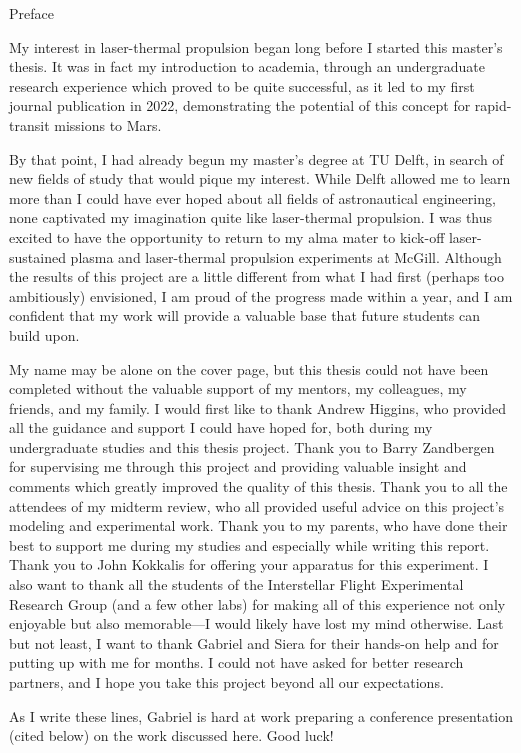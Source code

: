 \begin{plainchp}{Preface}
    \begin{refsection}
    My interest in laser-thermal propulsion began long before I started this master's thesis. It was in fact my introduction to academia, through an undergraduate research experience which proved to be quite successful, as it led to my first journal publication in 2022, demonstrating the potential of this concept for rapid-transit missions to Mars.
    
    By that point, I had already begun my master's degree at TU Delft, in search of new fields of study that would pique my interest. While Delft allowed me to learn more than I could have ever hoped about all fields of astronautical engineering, none captivated my imagination quite like laser-thermal propulsion. I was thus excited to have the opportunity to return to my alma mater to kick-off laser-sustained plasma and laser-thermal propulsion experiments at McGill. Although the results of this project are a little different from what I had first (perhaps too ambitiously) envisioned, I am proud of the progress made within a year, and I am confident that my work will provide a valuable base that future students can build upon.

    My name may be alone on the cover page, but this thesis could not have been completed without the valuable support of my mentors, my colleagues, my friends, and my family. I would first like to thank Andrew Higgins, who provided all the guidance and support I could have hoped for, both during my undergraduate studies and this thesis project. Thank you to Barry Zandbergen for supervising me through this project and providing valuable insight and comments which greatly improved the quality of this thesis. Thank you to all the attendees of my midterm review, who all provided useful advice on this project's modeling and experimental work. Thank you to my parents, who have done their best to support me during my studies and especially while writing this report. Thank you to John Kokkalis for offering your apparatus for this experiment. I also want to thank all the students of the Interstellar Flight Experimental Research Group (and a few other labs) for making all of this experience not only enjoyable but also memorable---I would likely have lost my mind otherwise. Last but not least, I want to thank Gabriel and Siera for their hands-on help and for putting up with me for months. I could not have asked for better research partners, and I hope you take this project beyond all our expectations.

    As I write these lines, Gabriel is hard at work preparing a conference presentation (cited below) on the work discussed here. Good luck!

    \end{refsection}
\end{plainchp}